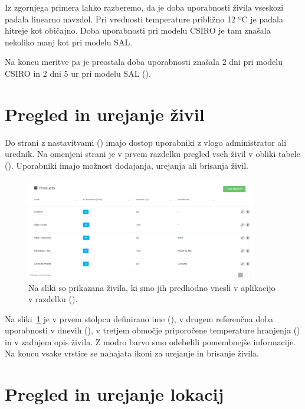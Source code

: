 \documentclass[a4paper, 12pt]{book}
\begin{document}
Iz zgornjega primera lahko razberemo, da je doba uporabnosti živila vseskozi padala linearno navzdol. Pri vrednosti temperature približno 12 ºC je padala hitreje kot običajno. Doba uporabnosti pri modelu CSIRO je tam znašala nekoliko manj kot pri modelu SAL.

Na koncu meritve pa je preostala doba uporabnosti znašala 2 dni pri modelu CSIRO in 2 dni 5 ur pri modelu SAL ().



\section{Pregled in urejanje živil}

Do strani z nastavitvami () imajo dostop uporabniki z vlogo administrator ali urednik. Na omenjeni strani je v prvem razdelku pregled vseh živil v obliki tabele (). Uporabniki imajo možnost dodajanja, urejanja ali brisanja živil.

\begin{figure}[h]
\begin{center}
\includegraphics[width=0.9\textwidth]{slike/products.png}
\end{center}
\caption{Na sliki so prikazana živila, ki smo jih predhodno vnesli v aplikacijo v razdelku ().}
\label{ss-settings-products}
\end{figure}

Na sliki~\ref{ss-settings-products} je v prvem stolpcu definirano ime (), v drugem referenčna doba uporabnosti v dnevih (), v tretjem območje priporočene temperature hranjenja () in v zadnjem opis živila. Z modro barvo smo odebelili pomembnejše informacije. Na koncu vsake vrstice se nahajata ikoni za urejanje in brisanje živila.



\section{Pregled in urejanje lokacij}
\end{document}
